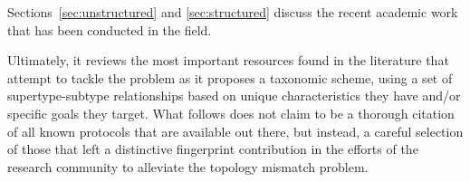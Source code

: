 Sections~\ref{sec:unstructured} and \ref{sec:structured} discuss the recent
academic work that has been conducted in the field.

Ultimately, it reviews the most important resources found in the literature that
attempt to tackle the problem as it proposes a taxonomic scheme, using a set of
supertype-subtype relationships based on unique characteristics they have and/or
specific goals they target. What follows does not claim to be a thorough
citation of all known protocols that are available out there, but instead, a
careful selection of those that left a distinctive fingerprint contribution in
the efforts of the research community to alleviate the topology mismatch
problem.